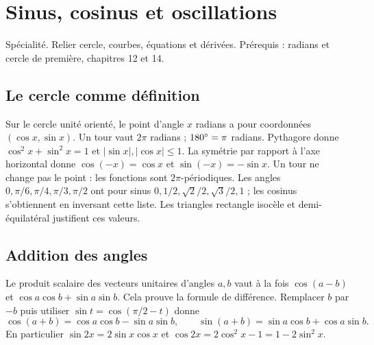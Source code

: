 \documentclass[../cours_tle.tex]{subfiles}
\begin{document}
\setcounter{chapter}{16}
\chapter{Sinus, cosinus et oscillations}
\label{ch:17}
\begin{objectif}
Spécialité. Relier cercle, courbes, équations et dérivées. Prérequis : radians et cercle de première, chapitres 12 et 14.
\end{objectif}
\section{Le cercle comme définition}
Sur le cercle unité orienté, le point d'angle $x$ radians a pour coordonnées $(\cos x,\sin x)$. Un tour vaut $2\pi$ radians ; $180^{\circ}=\pi$ radians.
Pythagore donne $\cos^2x+\sin^2x=1$ et $|\sin x|,|\cos x|\le1$.
La symétrie par rapport à l'axe horizontal donne $\cos(-x)=\cos x$ et $\sin(-x)=-\sin x$. Un tour ne change pas le point : les fonctions sont $2\pi$-périodiques.
Les angles $0,\pi/6,\pi/4,\pi/3,\pi/2$ ont pour sinus $0,1/2,\sqrt2/2,\sqrt3/2,1$ ; les cosinus s'obtiennent en inversant cette liste. Les triangles rectangle isocèle et demi-équilatéral justifient ces valeurs.
\section{Addition des angles}
Le produit scalaire des vecteurs unitaires d'angles $a,b$ vaut à la fois $\cos(a-b)$ et $\cos a\cos b+\sin a\sin b$. Cela prouve la formule de différence.
Remplacer $b$ par $-b$ puis utiliser $\sin t=\cos(\pi/2-t)$ donne
\[
\cos(a+b)=\cos a\cos b-\sin a\sin b,\qquad
\sin(a+b)=\sin a\cos b+\cos a\sin b.
\]
En particulier $\sin2x=2\sin x\cos x$ et $\cos2x=2\cos^2x-1=1-2\sin^2x$.
\end{document}
